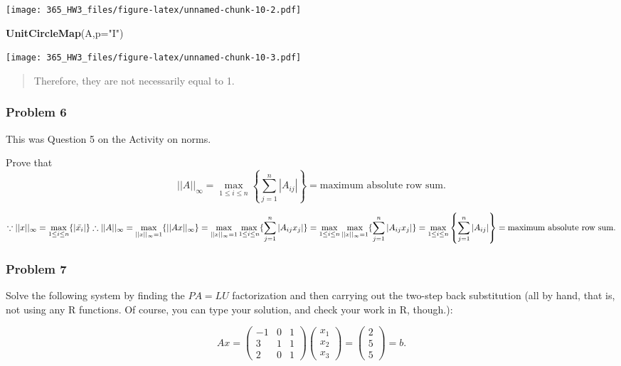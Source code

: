 \documentclass[]{article}
\newenvironment{Shaded}{\begin{snugshade}}{\end{snugshade}}
\newcommand{\DataTypeTok}[1]{\textcolor[rgb]{0.13,0.29,0.53}{#1}}
\newcommand{\KeywordTok}[1]{\textcolor[rgb]{0.13,0.29,0.53}{\textbf{#1}}}
\newcommand{\NormalTok}[1]{#1}
\newcommand{\StringTok}[1]{\textcolor[rgb]{0.31,0.60,0.02}{#1}}
\begin{document}
\texttt{[image: 365\_HW3\_files/figure-latex/unnamed-chunk-10-2.pdf]}

\begin{Shaded}
\begin{Highlighting}[]
\KeywordTok{UnitCircleMap}\NormalTok{(A,}\DataTypeTok{p=}\StringTok{"I"}\NormalTok{)}
\end{Highlighting}
\end{Shaded}

\texttt{[image: 365\_HW3\_files/figure-latex/unnamed-chunk-10-3.pdf]}

\begin{quote}
Therefore, they are not necessarily equal to 1.
\end{quote}

\hypertarget{problem-6}{%
\subsubsection{Problem 6}\label{problem-6}}

This was Question 5 on the Activity on norms.

Prove that
\[ ||A||_{\infty}=\max_{1 \leq i \leq n}\left\{ \sum_{j=1}^n |A_{ij}| \right\}=\text{maximum absolute row sum}.\]


\iffalse{} {Proof. } \fi{}\[
\because ||x||_{\infty} = \max_{1 \leq i\leq n}\{|\bar{x_i}|\}\\
\therefore ||A||_{\infty}=\max_{||x||_{\infty}=1}\{||Ax||_{\infty}\}=\max_{||x||_{\infty}=1}\max_{1 \leq i \leq n}\{\sum^{n}_{j=1}|A_{ij}x_{j}|\}=\max_{1 \leq i \leq n}\max_{||x||_{\infty}=1}\{\sum^{n}_{j=1}|A_{ij}x_{j}|\} \\= 
\max_{1 \leq i \leq n}\left\{ \sum_{j=1}^n |A_{ij}| \right\}=\text{maximum absolute row sum}.
\]


\hypertarget{problem-7}{%
\subsubsection{Problem 7}\label{problem-7}}

Solve the following system by finding the \(PA=LU\) factorization and
then carrying out the two-step back substitution (all by hand, that is,
not using any R functions. Of course, you can type your solution, and
check your work in R, though.):

\[ Ax=\begin{pmatrix}-1 & 0 & 1 \\
3 & 1 & 1 \\
2 & 0 & 1 
\end{pmatrix} \begin{pmatrix} x_1 \\ x_2\\ x_3\end{pmatrix}=\begin{pmatrix} 2 \\ 5 \\ 5 \end{pmatrix}=b. \]
\end{document}
